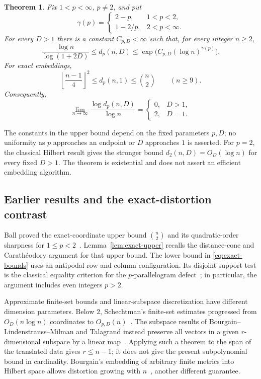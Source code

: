 \documentclass[11pt]{article}
\newtheorem{theorem}{Theorem}[section]
\theoremstyle{remark}
\numberwithin{equation}{section}
\begin{document}
\begin{theorem}\label{thm:main}
Fix $1<p<\infty$, $p\ne2$, and put
\[
 \gamma(p)=
 \begin{cases}
  2-p,&1<p<2,\\
  1-2/p,&2<p<\infty.
 \end{cases}
\]
For every $D>1$ there is a constant $C_{p,D}<\infty$ such that, for
every integer $n\ge2$,
\begin{equation}\label{eq:main-bounds}
 \frac{\log n}{\log(1+2D)}
 \le d_p(n,D)
 \le \exp\!\bigl(C_{p,D}(\log n)^{\gamma(p)}\bigr).
\end{equation}
For exact embeddings,
\begin{equation}\label{eq:exact-bounds}
 \left\lfloor\frac{n-1}{4}\right\rfloor^2
 \le d_p(n,1)\le\binom n2\qquad(n\ge9).
\end{equation}
Consequently,
\[
 \lim_{n\to\infty}\frac{\log d_p(n,D)}{\log n}
 =\begin{cases}0,&D>1,\\2,&D=1.\end{cases}
\]
\end{theorem}

The constants in the upper bound depend on the fixed parameters $p,D$;
no uniformity as $p$ approaches an endpoint or $D$ approaches $1$ is
asserted. For $p=2$, the classical Hilbert result gives the stronger
bound $d_2(n,D)=O_D(\log n)$ for every fixed $D>1$.
The theorem is existential and does not assert an efficient embedding
algorithm.

\subsection{Earlier results and the exact-distortion contrast}

Ball proved the exact-coordinate upper bound $\binom n2$ and its
quadratic-order sharpness for $1\le p<2$~\cite{Ball1990}.
Lemma~\ref{lem:exact-upper} recalls the distance-cone and
Carath\'eodory argument for that upper bound. The lower bound in
\eqref{eq:exact-bounds} uses an antipodal row-and-column configuration.
Its disjoint-support test is the classical equality criterion for the
$p$-parallelogram defect~\cite[Corollary~2.1]{Lamperti1958}; in particular,
the argument includes even integers $p>2$.

Approximate finite-set bounds and linear-subspace discretization have
different dimension parameters. Below $2$, Schechtman's finite-set
estimates progressed from $O_D(n\log n)$ coordinates to
$O_{p,D}(n)$~\cite{Schechtman1987,Schechtman2011}.
The subspace results of Bourgain--Lindenstrauss--Milman and Talagrand
instead preserve all vectors in a given $r$-dimensional subspace by a
linear map~\cite{BourgainLindenstraussMilman1989,Talagrand1995}.
Applying such a theorem to the span of the translated data gives
$r\le n-1$;
it does not give the present subpolynomial bound in cardinality.
Bourgain's embedding of arbitrary finite metrics into Hilbert space
allows distortion growing with $n$~\cite{Bourgain1985}, another
different guarantee.
\end{document}
